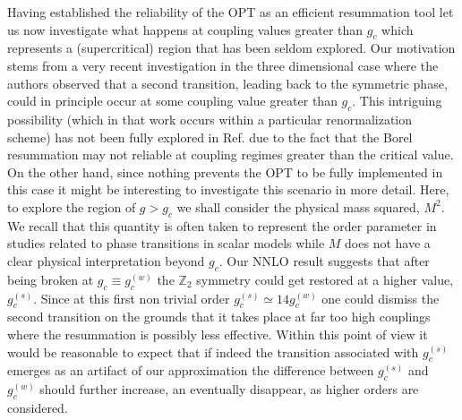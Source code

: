 \documentclass[a4paper,11pt]{article}
\begin{document}
Having established the reliability of the OPT as an efficient resummation tool let us  now investigate what happens at coupling values greater than $g_c$ which represents a (supercritical) region that has been seldom explored. Our motivation stems from a  very recent investigation \cite{serone4} in the three dimensional case where the authors observed that a second transition, leading back to the symmetric phase, could in principle occur at some coupling value greater than $g_c$. This intriguing possibility (which in that work occurs within a particular renormalization scheme) has not been fully explored in Ref. \cite {serone4} due to the fact that the Borel resummation  may not reliable at coupling regimes greater than the critical value. On the other hand, since nothing prevents the OPT  to  be fully implemented in this case it might be interesting to investigate this scenario in more detail. Here, to explore the region of $g>g_c$ we shall consider the physical mass squared, $M^2$. We recall that this quantity is often taken to represent  the order parameter in studies related to phase transitions in scalar models \cite {OPTphi4} while  $M$ does not have a clear physical interpretation  beyond $g_c$. Our NNLO result suggests that  after being broken at  $g_c \equiv g_c^{(w)}$   the  $\mathbb{Z}_2$ symmetry could get restored at a higher value, $g_c^{(s)}$. Since at this first non trivial  order $g_c^{(s)} \simeq 14 g_c^{(w)}$ one could  dismiss the second transition on the grounds that it takes place at far too high couplings where the resummation is possibly  less effective. Within this point of view it would be reasonable to  expect that if indeed the  transition associated with $g_c^{(s)}$  emerges as an artifact of our approximation  the difference between $g_c^{(s)}$ and $g_c^{(w)}$ should further increase, an eventually disappear, as higher orders are considered. 
\end{document}
